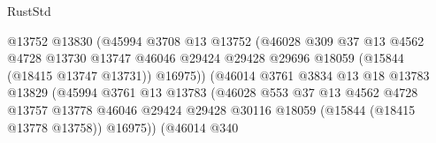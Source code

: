 \begin{lexlean}{RustStd}
\begin{coremodule}
                                          @13752
                                          @13830
                                          (@45994
                                            @3708
                                            @13
                                            @13752
                                            (@46028
                                              @309
                                              @37
                                              @13
                                              @4562
                                              @4728
                                              @13730
                                              @13747
                                              @46046
                                              @29424
                                              @29428
                                              @29696
                                              @18059
                                              (@15844 (@18415 @13747 @13731))
                                              @16975))
                                          (@46014
                                            @3761
                                            @3834
                                            @13
                                            @18
                                            @13783
                                            @13829
                                            (@45994
                                              @3761
                                              @13
                                              @13783
                                              (@46028
                                                @553
                                                @37
                                                @13
                                                @4562
                                                @4728
                                                @13757
                                                @13778
                                                @46046
                                                @29424
                                                @29428
                                                @30116
                                                @18059
                                                (@15844 (@18415 @13778 @13758))
                                                @16975))
                                            (@46014
                                              @340

\end{coremodule}
\end{lexlean}
